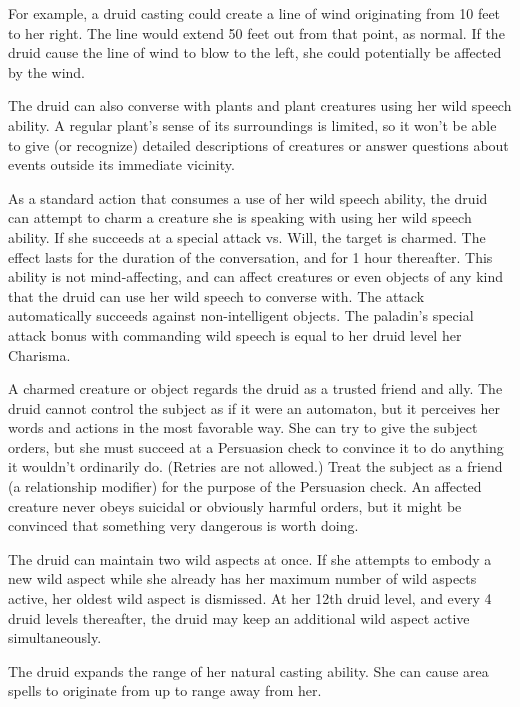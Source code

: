 For example, a druid casting  could create a line of wind originating from 10 feet to her right. The line would extend 50 feet out from that point, as normal. If the druid cause the line of wind to blow to the left, she could potentially be affected by the wind.

 The druid can also converse with plants and plant creatures using her wild speech ability. A regular plant's sense of its surroundings is limited, so it won't be able to give (or recognize) detailed descriptions of creatures or answer questions about events outside its immediate vicinity.

 As a standard action that consumes a use of her wild speech ability, the druid can attempt to charm a creature she is speaking with using her wild speech ability. If she succeeds at a special attack vs. Will, the target is charmed. The effect lasts for the duration of the conversation, and for 1 hour thereafter. This ability is not mind-affecting, and can affect creatures or even objects of any kind that the druid can use her wild speech to converse with. The attack automatically succeeds against non-intelligent objects. The paladin's special attack bonus with commanding wild speech is equal to her druid level \add her Charisma.

A charmed creature or object regards the druid as a trusted friend and ally. The druid cannot control the subject as if it were an automaton, but it perceives her words and actions in the most favorable way. She can try to give the subject orders, but she must succeed at a Persuasion check to convince it to do anything it wouldn't ordinarily do. (Retries are not allowed.) Treat the subject as a friend (a  relationship modifier) for the purpose of the Persuasion check. An affected creature never obeys suicidal or obviously harmful orders, but it might be convinced that something very dangerous is worth doing.

 The druid can maintain two wild aspects at once. If she attempts to embody a new wild aspect while she already has her maximum number of wild aspects active, her oldest wild aspect is dismissed. At her 12th druid level, and every 4 druid levels thereafter, the druid may keep an additional wild aspect active simultaneously.

 The druid expands the range of her natural casting ability. She can cause area spells to originate from up to \rngclose range away from her.

